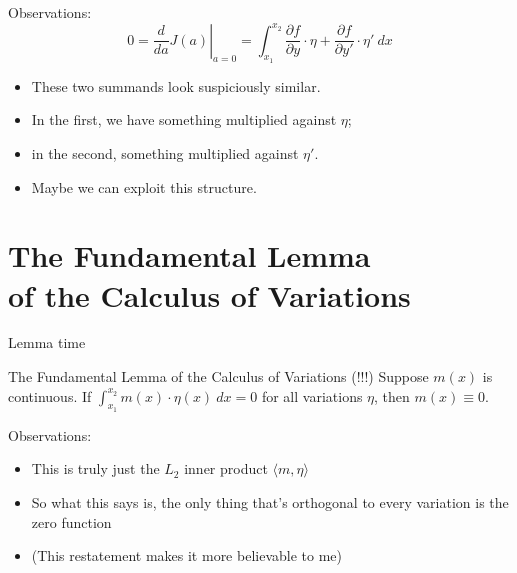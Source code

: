 \documentclass[handout]{beamer}
\begin{document}
\begin{frame}{Observations:}
    \[0 = \left.\dfrac{d}{da} J(a) \right|_{a=0} = 
            \int_{x_1}^{x_2} \dfrac{\partial f}{\partial y} \cdot \eta +
            \dfrac{\partial f}{\partial y'} \cdot \eta' \ dx\] \pause
    \begin{itemize}
        \item These two summands look suspiciously similar. \pause
        \item In the first, we have something multiplied against $\eta$; \pause
        \item in the second, something multiplied against $\eta'$. \pause
        \item Maybe we can exploit this structure.
    \end{itemize}
\end{frame}
\section[FLCOV]{The Fundamental Lemma \\ of the Calculus of Variations}

\begin{frame}{Lemma time}
    \begin{alertblock}{The Fundamental Lemma of the Calculus of Variations (!!!)}
    Suppose $m(x)$ is continuous. If $\int_{x_1}^{x_2}m(x) \cdot \eta(x)\ dx = 0$ for \alert{all} variations $\eta$, then $m(x) \equiv 0$.
    \end{alertblock} \pause
    Observations: \pause
    \begin{itemize}
        \item This is truly just the $L_2$ inner product $\langle m, \eta \rangle$ \pause
        \item So what this says is, the only thing that's orthogonal to every variation is the zero function \pause
        \item (This restatement makes it more believable to me)
    \end{itemize}
\end{frame}
\end{document}
